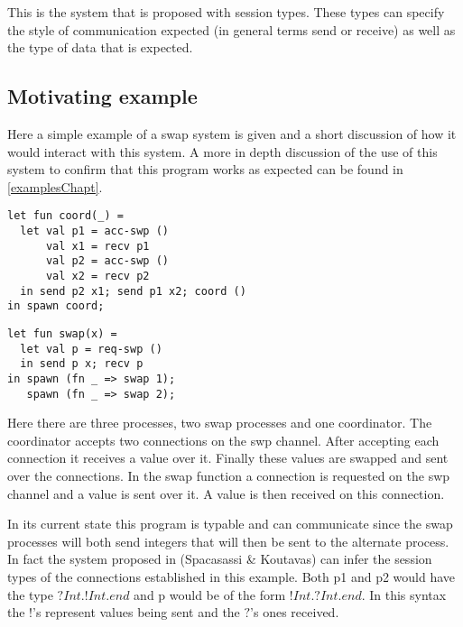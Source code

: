 This is the system that is proposed with session types. These types can specify the style of communication expected (in general terms send or receive) as well as the type of data that is expected. 

\subsection{Motivating example}

Here a simple example of a swap system is given and a short discussion of how it would interact with this system. A more in depth discussion of the use of this system to confirm that this program works as expected can be found in \ref{examplesChapt}. 

\begin{minipage}{.45\textwidth}
\begin{lstlisting}[backgroundcolor=\color{white},numbers=none]
let fun coord(_) =
  let val p1 = acc-swp ()
      val x1 = recv p1
      val p2 = acc-swp ()
      val x2 = recv p2
  in send p2 x1; send p1 x2; coord ()
in spawn coord;
\end{lstlisting}
\end{minipage}
\hfill
\begin{minipage}{.45\textwidth}
\begin{lstlisting}[backgroundcolor=\color{white},numbers=none]
let fun swap(x) =
  let val p = req-swp ()
  in send p x; recv p
in spawn (fn _ => swap 1);
   spawn (fn _ => swap 2);
\end{lstlisting}
\vspace{2em}
\end{minipage}

Here there are three processes, two swap processes and one coordinator. The coordinator accepts two connections on the swp channel. After accepting each connection it receives a value over it. Finally these values are swapped and sent over the connections. In the swap function a connection is requested on the swp channel and a value is sent over it. A value is then received on this connection. 

In its current state this program is typable and can communicate since the swap processes will both send integers that will then be sent to the alternate process. In fact the system proposed in (Spacasassi \& Koutavas) \cite{paper1} can infer the session types of the connections established in this example. Both p1 and p2 would have the type $?Int.!Int.end$ and p would be of the form $!Int.?Int.end$. In this syntax the $!$'s represent values being sent and the $?$'s ones received. 

